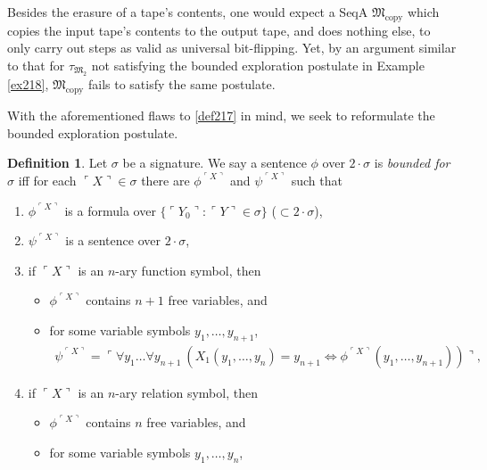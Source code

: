 \documentclass[12pt, twoside]{memoir}
\numberwithin{equation}{section}
\theoremstyle{definition}
\newtheorem{defi}[thm]{Definition}
\theoremstyle{remark}
\theoremstyle{definition}
\theoremstyle{definition}
\theoremstyle{definition}
\theoremstyle{remark}
\begin{document}
Besides the erasure of a tape's contents, one would expect a SeqA $\mathfrak{M}_{\text{copy}}$ which copies the input tape's contents to the output tape, and does nothing else, to only carry out steps as valid as universal bit-flipping. Yet, by an argument similar to that for $\tau_{\mathfrak{M}_2}$ not satisfying the bounded exploration postulate in Example \ref{ex218}, $\mathfrak{M}_{\text{copy}}$ fails to satisfy the same postulate. 

With the aforementioned flaws to \ref{def217} in mind, we seek to reformulate the bounded exploration postulate.

\begin{defi}\label{def220}
Let $\sigma$ be a signature. We say a sentence $\phi$ over $2 \cdot \sigma$ is \emph{bounded for} $\sigma$ iff for each $\ulcorner X \urcorner \in \sigma$ there are $\phi^{\ulcorner X \urcorner}$ and $\psi^{\ulcorner X \urcorner}$ such that
\begin{enumerate}[label=(\alph*)]
    \item $\phi^{\ulcorner X \urcorner}$ is a formula over $\{\ulcorner Y_0 \urcorner : \ulcorner Y \urcorner \in \sigma\}$ ($\subset 2 \cdot \sigma$),
    \item $\psi^{\ulcorner X \urcorner}$ is a sentence over $2 \cdot \sigma$,
    \item if $\ulcorner X \urcorner$ is an $n$-ary function symbol, then 
    \begin{itemize}[label=$\circ$, leftmargin=20pt]
        \item $\phi^{\ulcorner X \urcorner}$ contains $n + 1$ free variables, and
        \item for some variable symbols $y_1, \dots, y_{n+1}$,
        \begin{align*}
            \psi^{\ulcorner X \urcorner} = \ulcorner \forall y_1 \dots \forall y_{n+1} \ (X_1(y_1, \dots, y_n) = y_{n+1} \iff \phi^{\ulcorner X \urcorner}(y_1, \dots, y_{n+1})) \urcorner \text{,}
        \end{align*}
    \end{itemize}
    \item if $\ulcorner X \urcorner$ is an $n$-ary relation symbol, then 
    \begin{itemize}[label=$\circ$, leftmargin=20pt]
        \item $\phi^{\ulcorner X \urcorner}$ contains $n$ free variables, and
        \item for some variable symbols $y_1, \dots, y_n$,
        \begin{align*}

\end{align*}
\end{itemize}
\end{enumerate}
\end{defi}
\end{document}
